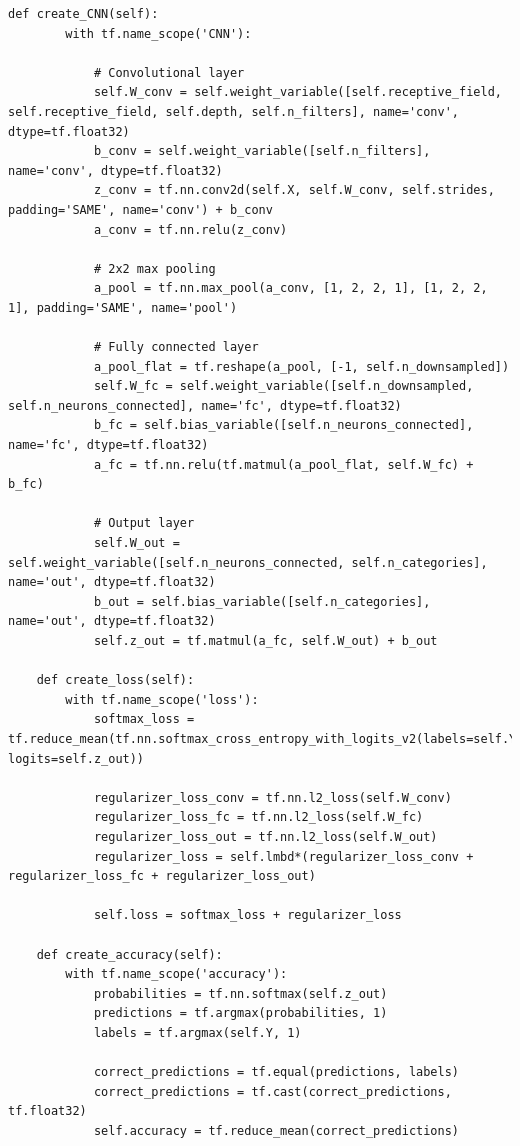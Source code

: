 \documentclass[%
oneside,                 %
final,                   %
10pt]{article}
\begin{document}
\begin{Verbatim}[numbers=none,fontsize=\fontsize{9pt}{9pt},baselinestretch=0.95]
    def create_CNN(self):
        with tf.name_scope('CNN'):
            
            # Convolutional layer
            self.W_conv = self.weight_variable([self.receptive_field, self.receptive_field, self.depth, self.n_filters], name='conv', dtype=tf.float32)
            b_conv = self.weight_variable([self.n_filters], name='conv', dtype=tf.float32)
            z_conv = tf.nn.conv2d(self.X, self.W_conv, self.strides, padding='SAME', name='conv') + b_conv
            a_conv = tf.nn.relu(z_conv)
            
            # 2x2 max pooling
            a_pool = tf.nn.max_pool(a_conv, [1, 2, 2, 1], [1, 2, 2, 1], padding='SAME', name='pool')
            
            # Fully connected layer
            a_pool_flat = tf.reshape(a_pool, [-1, self.n_downsampled])
            self.W_fc = self.weight_variable([self.n_downsampled, self.n_neurons_connected], name='fc', dtype=tf.float32)
            b_fc = self.bias_variable([self.n_neurons_connected], name='fc', dtype=tf.float32)
            a_fc = tf.nn.relu(tf.matmul(a_pool_flat, self.W_fc) + b_fc)
            
            # Output layer
            self.W_out = self.weight_variable([self.n_neurons_connected, self.n_categories], name='out', dtype=tf.float32)
            b_out = self.bias_variable([self.n_categories], name='out', dtype=tf.float32)
            self.z_out = tf.matmul(a_fc, self.W_out) + b_out
    
    def create_loss(self):
        with tf.name_scope('loss'):
            softmax_loss = tf.reduce_mean(tf.nn.softmax_cross_entropy_with_logits_v2(labels=self.Y, logits=self.z_out))
            
            regularizer_loss_conv = tf.nn.l2_loss(self.W_conv)
            regularizer_loss_fc = tf.nn.l2_loss(self.W_fc)
            regularizer_loss_out = tf.nn.l2_loss(self.W_out)
            regularizer_loss = self.lmbd*(regularizer_loss_conv + regularizer_loss_fc + regularizer_loss_out)
            
            self.loss = softmax_loss + regularizer_loss

    def create_accuracy(self):
        with tf.name_scope('accuracy'):
            probabilities = tf.nn.softmax(self.z_out)
            predictions = tf.argmax(probabilities, 1)
            labels = tf.argmax(self.Y, 1)
            
            correct_predictions = tf.equal(predictions, labels)
            correct_predictions = tf.cast(correct_predictions, tf.float32)
            self.accuracy = tf.reduce_mean(correct_predictions)
    

\end{Verbatim}
\end{document}
